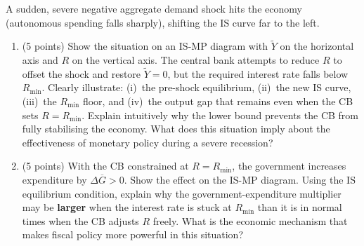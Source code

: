 \documentclass[letterpaper,12pt]{article}
\theoremstyle{dotlessS}
\begin{document}
A sudden, severe negative aggregate demand shock hits the economy (autonomous spending falls sharply), shifting the IS curve far to the left.
\begin{enumerate}[label=(\alph*)]
\item (5 points) Show the situation on an IS-MP diagram with $\widetilde{Y}$ on the horizontal axis and $R$ on the vertical axis. The central bank attempts to reduce $R$ to offset the shock and restore $\widetilde{Y}=0$, but the required interest rate falls below $R_{\min}$. Clearly illustrate: (i)~the pre-shock equilibrium, (ii)~the new IS curve, (iii)~the $R_{\min}$ floor, and (iv)~the output gap that remains even when the CB sets $R = R_{\min}$. Explain intuitively why the lower bound prevents the CB from fully stabilising the economy. What does this situation imply about the effectiveness of monetary policy during a severe recession?

\item (5 points) With the CB constrained at $R = R_{\min}$, the government increases expenditure by $\Delta\overline{G} > 0$. Show the effect on the IS-MP diagram. Using the IS equilibrium condition, explain why the government-expenditure multiplier may be \textbf{larger} when the interest rate is stuck at $R_{\min}$ than it is in normal times when the CB adjusts $R$ freely. What is the economic mechanism that makes fiscal policy more powerful in this situation?
\end{enumerate}


\end{document}
